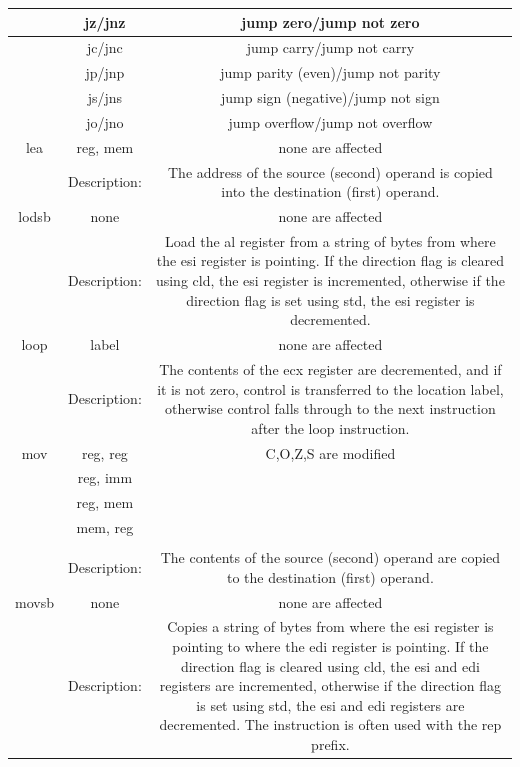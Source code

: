 \documentclass[10pt]{article}
\begin{document}
\begin{center}
\begin{tabular}{|c|c|c|}
\hline
 & jz/jnz & jump zero/jump not zero \\
\hline
 & jc/jnc & jump carry/jump not carry \\
\hline
 & jp/jnp & jump parity (even)/jump not parity \\
\hline
 & js/jns & jump sign (negative)/jump not sign \\
\hline
 & jo/jno & jump overflow/jump not overflow \\
\hline
lea & reg, mem & none are affected \\
\hline
 & Description: & The address of the source (second) operand is copied into the destination (first) operand. \\
\hline
lodsb & none & none are affected \\
\hline
 & Description: & Load the al register from a string of bytes from where the esi register is pointing. If the direction flag is cleared using cld, the esi register is incremented, otherwise if the direction flag is set using std, the esi register is decremented. \\
\hline
loop & label & none are affected \\
\hline
 & Description: & The contents of the ecx register are decremented, and if it is not zero, control is transferred to the location label, otherwise control falls through to the next instruction after the loop instruction. \\
\hline
mov & reg, reg & C,O,Z,S are modified \\
\hline
 & reg, imm &  \\
\hline
 & reg, mem &  \\
\hline
 & mem, reg &  \\
\hline
 &  &  \\
\hline
 & Description: & The contents of the source (second) operand are copied to the destination (first) operand. \\
\hline
movsb & none & none are affected \\
\hline
 & Description: & Copies a string of bytes from where the esi register is pointing to where the edi register is pointing. If the direction flag is cleared using cld, the esi and edi registers are incremented, otherwise if the direction flag is set using std, the esi and edi registers are decremented. The instruction is often used with the rep prefix. \\
\hline
\end{tabular}
\end{center}
\end{document}

